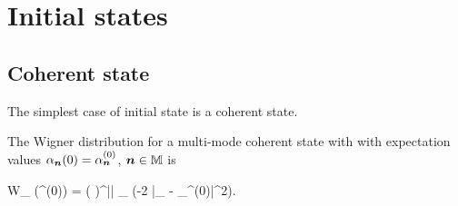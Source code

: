 \section{Initial states}

\subsection{Coherent state}

The simplest case of initial state is a coherent state.

\begin{theorem}
	The Wigner distribution for a multi-mode coherent state with with expectation values
	$\alpha_{\boldsymbol{n}}(0) = \alpha_{\boldsymbol{n}}^{(0)}$, $\boldsymbol{n} \in \mathbb{M}$ is
	\begin{eqn*}
		W_{} (\balpha^{(0)})
		= \left(  \right)^{|\restbasis|} \prod_{\nvec \in \restbasis}
			\exp(-2 |\alpha_{\nvec} - \alpha_{\nvec}^{(0)}|^2).
	\end{eqn*}
\end{theorem}
